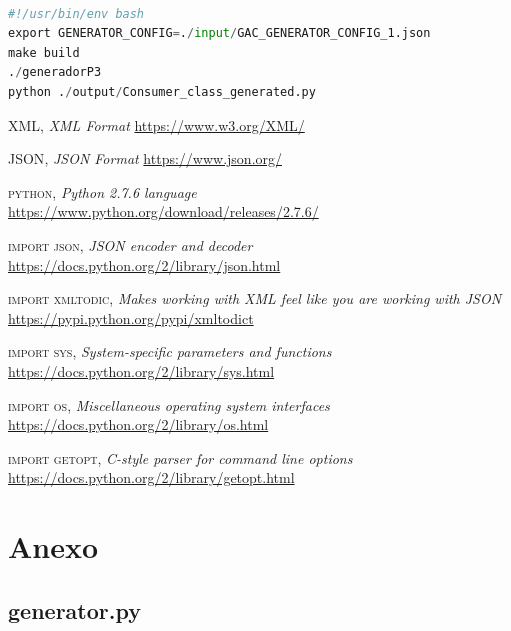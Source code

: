 \documentclass[a4paper,11pt]{book}
\begin{document}
\begin{lstlisting}[language=python,caption={make testCase1 }]

#!/usr/bin/env bash
export GENERATOR_CONFIG=./input/GAC_GENERATOR_CONFIG_1.json
make build
./generadorP3
python ./output/Consumer_class_generated.py

\end{lstlisting}



 

\begin{thebibliography}{aaaa}


 \textsc{XML},
\textit{XML Format}
\url{https://www.w3.org/XML/} 


 \textsc{JSON},
\textit{JSON Format}
\url{https://www.json.org/} 


 \textsc{python},
\textit{Python 2.7.6 language}
\url{https://www.python.org/download/releases/2.7.6/} 


 \textsc{import json},
\textit{JSON encoder and decoder}
\url{https://docs.python.org/2/library/json.html} 

 \textsc{import xmltodic},
\textit{Makes working with XML feel like you are working with JSON}
\url{https://pypi.python.org/pypi/xmltodict} 

 \textsc{import sys},
\textit{System-specific parameters and functions}
\url{https://docs.python.org/2/library/sys.html} 

 \textsc{import os},
\textit{Miscellaneous operating system interfaces}
\url{https://docs.python.org/2/library/os.html} 

 \textsc{import getopt},
\textit{C-style parser for command line options}
\url{https://docs.python.org/2/library/getopt.html}


\end{thebibliography}
 

\chapter{Anexo}
\section{generator.py}



%
%
%
%

%
%

\thispagestyle{empty}
\end{document}
